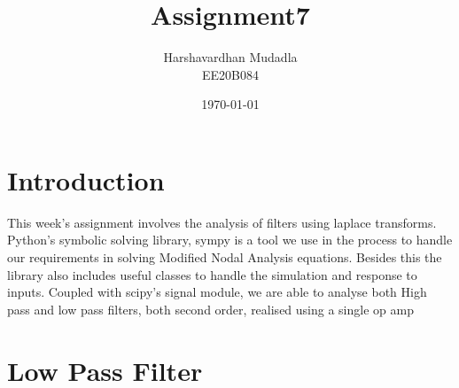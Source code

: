 \documentclass[11pt, a4paper]{article}
\title{Assignment7} %
\author{Harshavardhan Mudadla\\EE20B084} %
\date{\today} %
\begin{document}
		
		
\maketitle %
\section{Introduction}
This week’s assignment involves the analysis of filters using laplace transforms. Python’s symbolic solving library, sympy is a tool we use in the process to handle our requirements in solving Modified Nodal Analysis equations. Besides this the library also includes useful classes to handle the simulation and response to inputs. Coupled with scipy’s signal module, we are able to analyse both High pass and low pass filters, both second order, realised using a single op amp
\section{Low Pass Filter}
\end{document}

